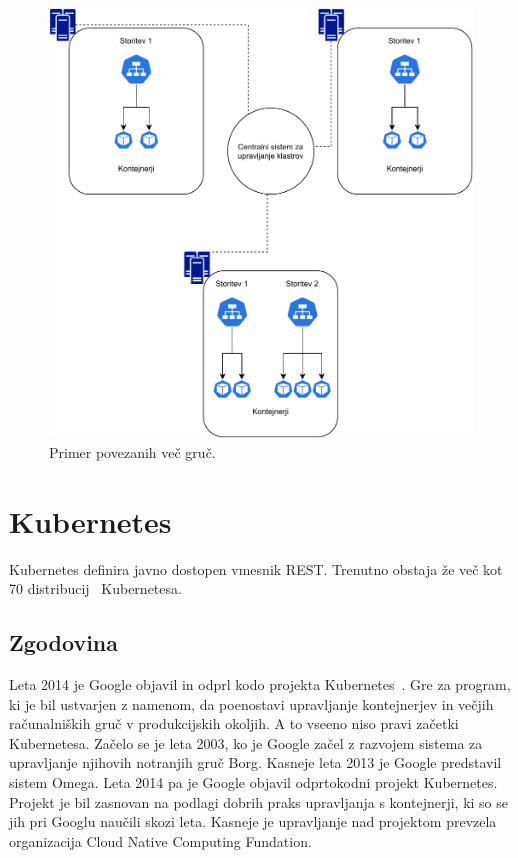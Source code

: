\documentclass[a4paper, 12pt]{book}
\begin{document}
\begin{figure}[h]
\begin{center}
\includegraphics[width=1.0\textwidth]{images/primer-povezanih-gruc.pdf}
\end{center}
\caption{Primer povezanih več gruč.}
\label{problem-povezanih-gruc}
\end{figure}

\chapter{Kubernetes}
\label{Kubernetes}
Kubernetes definira javno dostopen vmesnik REST.
Trenutno obstaja že več kot 70 distribucij~\cite{cncf} Kubernetesa.
\section{Zgodovina~\cite{mastering-kubernetes}}
Leta 2014 je Google objavil in odprl kodo projekta Kubernetes~\cite{what-is-Kubernetes}.
Gre za program, ki je bil ustvarjen z namenom, da poenostavi upravljanje kontejnerjev in večjih računalniških gruč v produkcijskih okoljih.
A to vseeno niso pravi začetki Kubernetesa.
Začelo se je leta 2003, ko je Google začel z razvojem sistema za upravljanje njihovih notranjih gruč Borg.
Kasneje leta 2013 je Google predstavil sistem Omega.
Leta 2014 pa je Google objavil odprtokodni projekt Kubernetes. 
Projekt je bil zasnovan na podlagi dobrih praks upravljanja s kontejnerji, ki so se jih pri Googlu naučili skozi leta.
Kasneje je upravljanje nad projektom prevzela organizacija Cloud Native Computing Fundation.
\end{document}

